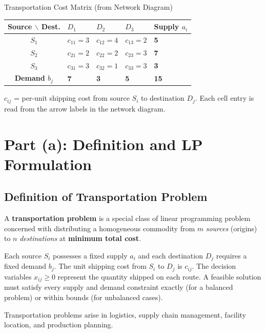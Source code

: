 \documentclass[12pt]{article}
\begin{document}
\begin{stepbox}{Transportation Cost Matrix (from Network Diagram)}
\vspace{4pt}
\begin{center}
\renewcommand{\arraystretch}{1.55}
\begin{tabular}{|c|C{2.2cm}|C{2.2cm}|C{2.2cm}|C{2.2cm}|}
  \hline
  {\color{white}\textbf{Source $\backslash$ Dest.}} &
  {\color{white}\textbf{$D_1$}} &
  {\color{white}\textbf{$D_2$}} &
  {\color{white}\textbf{$D_3$}} &
  {\color{white}\textbf{Supply $a_i$}} \\
  \hline
  \textbf{$S_1$} &
  $c_{11} = 3$ & $c_{12} = 4$ & $c_{13} = 2$ &
  \textbf{5} \\
  \hline
  \textbf{$S_2$} &
  $c_{21} = 2$ & $c_{22} = 2$ & $c_{23} = 3$ &
  \textbf{7} \\
  \hline
  \textbf{$S_3$} &
  $c_{31} = 3$ & $c_{32} = 1$ & $c_{33} = 3$ &
  \textbf{3} \\
  \hline
  \textbf{Demand $b_j$} & \textbf{7} & \textbf{3} & \textbf{5} &
  \textbf{15} \\
  \hline
\end{tabular}
\end{center}
\vspace{4pt}
{\small $c_{ij}$ = per-unit shipping cost from source $S_i$ to destination $D_j$.
Each cell entry is read from the arrow labels in the network diagram.}
\end{stepbox}

\vspace{10pt}

\section{Part (a): Definition and LP Formulation}

\subsection*{Definition of Transportation Problem}

\begin{defbox}
A \textbf{transportation problem} is a special class of linear programming problem concerned with distributing a homogeneous commodity from $m$ \emph{sources} (origins) to $n$ \emph{destinations} at \textbf{minimum total cost}.

Each source $S_i$ possesses a fixed supply $a_i$ and each destination $D_j$ requires a fixed demand $b_j$. The unit shipping cost from $S_i$ to $D_j$ is $c_{ij}$. The decision variables $x_{ij} \geq 0$ represent the quantity shipped on each route. A feasible solution must satisfy every supply and demand constraint exactly (for a balanced problem) or within bounds (for unbalanced cases).

Transportation problems arise in logistics, supply chain management, facility location, and production planning.
\end{defbox}
\end{document}
